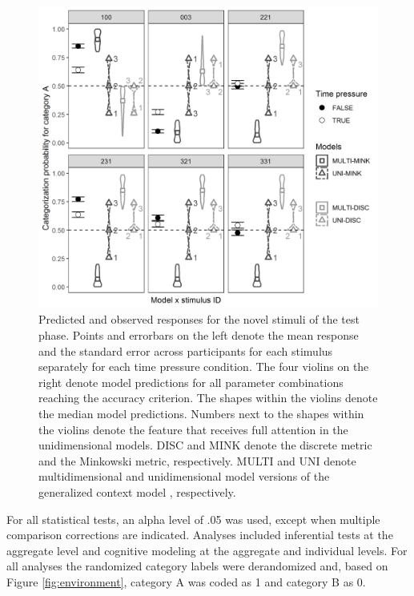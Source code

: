 \documentclass[a4paper,man,natbib]{apa6}
\begin{document}
\begin{figure}
\centering
\includegraphics[width = \textwidth]{fig_pred_obs_agg.png}
\caption{Predicted and observed responses for the novel stimuli of the test phase. Points and errorbars on the left denote the mean response and the standard error across participants for each stimulus separately for each time pressure condition. The four violins on the right denote model predictions for all parameter combinations reaching the accuracy criterion. The shapes within the violins denote the median model predictions. Numbers next to the shapes within the violins denote the feature that receives full attention in the unidimensional models. DISC and MINK denote the discrete metric and the Minkowski metric, respectively. MULTI and UNI denote multidimensional and unidimensional model versions of the generalized context model \citep{nosofsky1989further}, respectively.}
\label{fig:pred_obs_agg}
\end{figure}

For all statistical tests, an alpha level of .05 was used, except when multiple comparison corrections are indicated. Analyses included inferential tests at the aggregate level and cognitive modeling at the aggregate and individual levels. For all analyses the randomized category labels were derandomized and, based on Figure \ref{fig:environment}, category A was coded as 1 and category B as 0.
\end{document}
